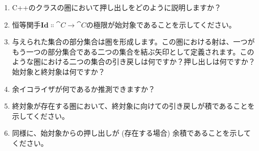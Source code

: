\begin{enumerate}
  \tightlist
  \item
        C++のクラスの圏において押し出しをどのように説明しますか？
  \item
        恒等関手$\mathbf{Id} \Colon \cat{C} \to \cat{C}$の極限が始対象であることを示してください。
  \item
        与えられた集合の部分集合は圏を形成します。この圏における射は、一つがもう一つの部分集合である二つの集合を結ぶ矢印として定義されます。このような圏における二つの集合の引き戻しは何ですか？押し出しは何ですか？始対象と終対象は何ですか？
  \item
        余イコライザが何であるか推測できますか？
  \item
        終対象が存在する圏において、終対象に向けての引き戻しが積であることを示してください。
  \item
        同様に、始対象からの押し出しが (存在する場合) 余積であることを示してください。
\end{enumerate}

